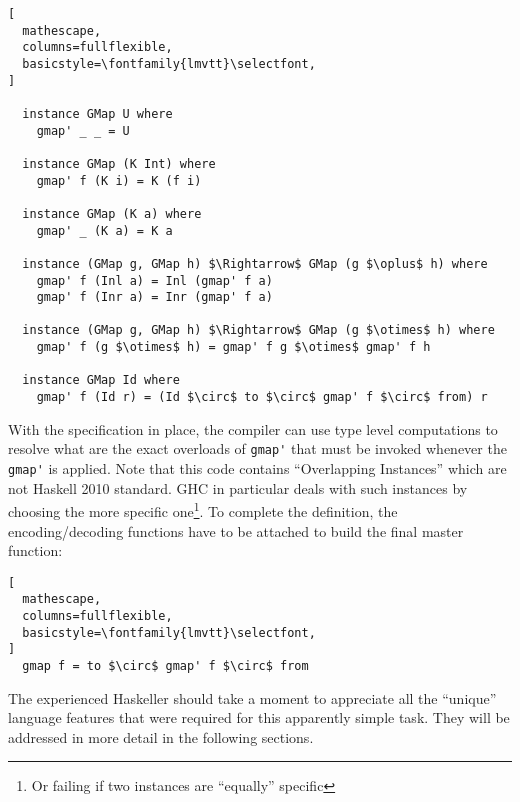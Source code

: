 \documentclass[8pt]{extarticle}
\begin{document}
\begin{lstlisting}[
  mathescape,
  columns=fullflexible,
  basicstyle=\fontfamily{lmvtt}\selectfont,
]

  instance GMap U where
    gmap' _ _ = U

  instance GMap (K Int) where
    gmap' f (K i) = K (f i)

  instance GMap (K a) where
    gmap' _ (K a) = K a

  instance (GMap g, GMap h) $\Rightarrow$ GMap (g $\oplus$ h) where
    gmap' f (Inl a) = Inl (gmap' f a)
    gmap' f (Inr a) = Inr (gmap' f a)

  instance (GMap g, GMap h) $\Rightarrow$ GMap (g $\otimes$ h) where
    gmap' f (g $\otimes$ h) = gmap' f g $\otimes$ gmap' f h

  instance GMap Id where
    gmap' f (Id r) = (Id $\circ$ to $\circ$ gmap' f $\circ$ from) r
\end{lstlisting}
With the specification in place, the compiler can use type level computations to resolve what are the exact overloads of \verb+gmap'+ that must be invoked whenever the \verb+gmap'+ is applied. Note that this code contains ``Overlapping Instances'' which are not Haskell 2010 standard. GHC in particular deals with such instances by choosing the more specific one\footnote{Or failing if two instances are ``equally'' specific}. To complete the definition, the encoding/decoding functions have to be attached to build the final master function:
\begin{lstlisting}[
  mathescape,
  columns=fullflexible,
  basicstyle=\fontfamily{lmvtt}\selectfont,
]
  gmap f = to $\circ$ gmap' f $\circ$ from
\end{lstlisting}
The experienced Haskeller should take a moment to appreciate all the ``unique'' language features that were required for this apparently simple task. They will be addressed in more detail in the following sections.
\end{document}
